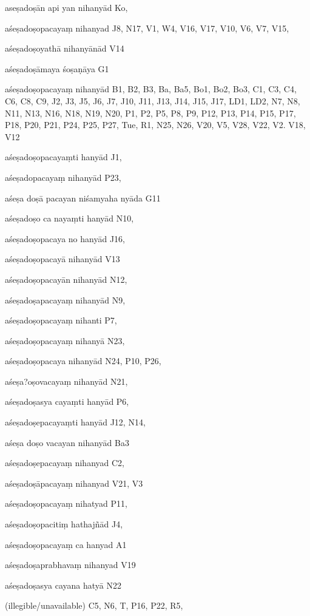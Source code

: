 \begin{marma}[hp02_009]
\begin{marma}[hp02_011]
 \begin{marma}[hp02_29c]
\item[aseṣadoṣān api yan nihanyād] Ko, 
\item[aśeṣadoṣopacayaṃ nihanyad] J8, N17, V1, W4, V16, V17, V10, V6, V7, V15, 
\item[aśeṣadoṣoyathā nihanyānād] V14
\item[aśeṣadoṣāmaya śoṣaṇāya] G1
\item[aśeṣadoṣopacayaṃ nihanyād] B1, B2, B3, Ba, Ba5, Bo1, Bo2, Bo3, C1, C3, C4, C6, C8, C9, J2, J3, J5, J6, J7, J10, J11, J13, J14, J15, J17, LD1, LD2, N7, N8, N11, N13, N16, N18, N19, N20, P1, P2, P5, P8, P9, P12, P13, P14, P15, P17, P18, P20, P21, P24, P25, P27, Tue, R1, N25, N26, V20, V5, V28, V22, V2. V18, V12
\item[aśeṣadoṣopacayaṃti hanyād] J1,
\item[aśeṣadopacayaṃ nihanyād] P23,
\item[aśeṣa doṣā pacayan niśamyaha nyāda] G11
\item[aśeṣadoṣo ca nayaṃti hanyād] N10,
\item[aśeṣadoṣopacaya no hanyād] J16,
\item[aśeṣadoṣopacayā nihanyād] V13
\item[aśeṣadoṣopacayān nihanyād] N12,
\item[aśeṣadoṣapacayaṃ nihanyād] N9,
\item[aśeṣadoṣopacayaṃ nihanti] P7, 
\item[aśeṣadoṣopacayaṃ nihanyā] N23,
\item[aśeṣadoṣopacaya nihanyād] N24, P10, P26, 
\item[aśeṣa?oṣovacayaṃ nihanyād] N21,
\item[aśeṣadoṣasya cayaṃti hanyād] P6,
\item[aśeṣadoṣepacayaṃti hanyād] J12, N14, 
\item[aśeṣa doṣo vacayan nihanyād] Ba3
\item[aśeṣadoṣepacayaṃ nihanyad] C2,
\item[aśeṣadoṣāpacayaṃ nihanyad] V21, V3
\item[aśeṣadoṣopacayaṃ nihatyad] P11, 
\item[aśeṣadoṣopacitiṃ hathajñād] J4,
\item[aśeṣadoṣopacayaṃ ca hanyad] A1
\item[aśeṣadoṣaprabhavaṃ nihanyad] V19
\item[aśeṣadoṣasya cayana hatyā] N22
\item[(illegible/unavailable)] C5, N6, T, P16, P22, R5,
  \begin{description}


\end{description}
\end{marma}
\end{marma}
\end{marma}
